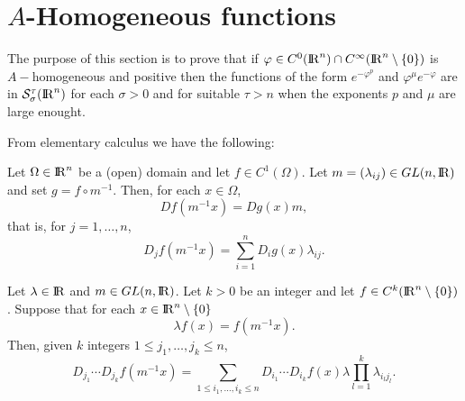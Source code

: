 \documentclass[12pt,a4paper]{amsart}
\begin{document}
\section{\label{section:SectionHomog}${A}$-Homogeneous functions}
{

The purpose of this section is to prove that if
${\varphi}\in C^0({{\rm I\kern-.185em R}}^{n})\cap C^{\infty}({{\rm I\kern-.185em R}}^{n}\setminus\{0\})$
is ${A}-$homogeneous and positive then the functions of the form
$e^{-{\varphi}^{p}}$ and ${\varphi}^{\mu} e^{-{\varphi}}$
are in ${{\mathcal{S}}_{\sigma}^{{\tau}}({{\rm I\kern-.185em R}}^{n})}$
for each ${\sigma}>0$ and for suitable ${\tau}>{n}$
when the exponents ${p}$ and ${\mu}$ are large enought.

From elementary calculus we have the following:

\begin{lemma}\label{lemma::LinearChange}
Let ${\Omega}\in{{\rm I\kern-.185em R}}^{n}$ be a (open) domain and let
${f}\in C^1({\Omega})$.
Let ${m}=({\lambda}_{{i}{j}})\in GL({n},{{\rm I\kern-.185em R}})$
and set ${g}={f}\circ{m}^{-1}$.
Then, for each ${x}\in{\Omega}$,
\begin{equation}\label{lemma::LinearChange::MatrForm}
{D}{f}({m}^{-1}{x})=D{g}({x}){m},
\end{equation}
that is, for ${j}=1,\ldots,{n}$,
\begin{equation}\label{lemma::LinearChange::Extended}
{D}_{j}{f}({m}^{-1}{x})=
\sum_{{i}=1}^{n}{D}_{i}{g}({x}){\lambda}_{{i}{j}}.
\end{equation}
\end{lemma}

\begin{proposition}\label{prop::EulerEx}
Let ${\lambda}\in{{\rm I\kern-.185em R}}$ and ${m}\in GL({n},{{\rm I\kern-.185em R}})$.
Let ${k}>0$ be an integer and let
${f}\in C^{k}({{\rm I\kern-.185em R}}^{n}\setminus\{0\})$.
Suppose that for each ${x}\in{{\rm I\kern-.185em R}}^{n}\setminus\{0\}$
\begin{equation}\label{prop::EulerEx::Homo}
	{\lambda}{f}({x})={f}({m}^{-1}{x}).
\end{equation}
Then, given ${k}$ integers
$1\leq{j}_1,\ldots,{j}_{k}\leq{n}$,
\begin{equation}\label{prop::EulerEx::ToProve}
	{D}_{{j}_1}\cdots{D}_{{j}_{k}}{f}({m}^{-1}{x})
	=\sum_{1\leq{i}_1,\ldots,{i}_{k}\leq{n}}
	{D}_{{i}_1}\cdots{D}_{{i}_{k}}{f}({x}){\lambda}
	\prod_{{l}=1}^{k}{\lambda}_{{i}_{l}{j}_{l}}.
\end{equation}
\end{proposition}

}
\end{document}

